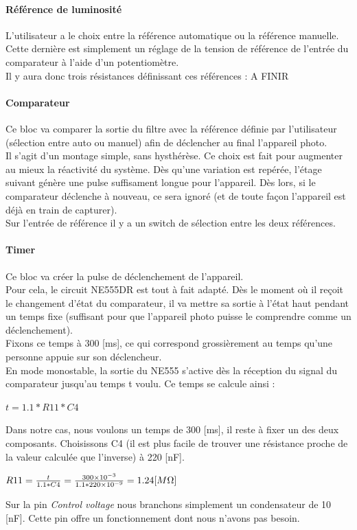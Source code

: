 \documentclass[a4paper,10pt]{article}
\begin{document}
\paragraph{Référence de luminosité}
L'utilisateur a le choix entre la référence automatique ou la référence manuelle. Cette dernière est simplement un réglage de la tension de référence de l'entrée du comparateur à l'aide d'un potentiomètre.\\
Il y aura donc trois résistances définissant ces références : A FINIR

\paragraph{Comparateur}
Ce bloc va comparer la sortie du filtre avec la référence définie par l'utilisateur (sélection entre auto ou manuel) afin de déclencher au final l'appareil photo. \\
Il s'agit d'un montage simple, sans hysthérèse. Ce choix est fait pour augmenter au mieux la réactivité du système. Dès qu'une variation est repérée, l'étage suivant génère une pulse suffisament longue pour l'appareil. Dès lors, si le comparateur déclenche à nouveau, ce sera ignoré (et de toute façon l'appareil est déjà en train de capturer). \\
Sur l'entrée de référence il y a un switch de sélection entre les deux références.

\paragraph{Timer}
Ce bloc va créer la pulse de déclenchement de l'appareil. \\
Pour cela, le circuit NE555DR est tout à fait adapté. Dès le moment où il reçoit le changement d'état du comparateur, il va mettre sa sortie à l'état haut pendant un temps fixe (suffisant pour que l'appareil photo puisse le comprendre comme un déclenchement). \\
Fixons ce temps à 300 [ms], ce qui correspond grossièrement au temps qu'une personne appuie sur son déclencheur. \\
En mode monostable, la sortie du NE555 s'active dès la réception du signal du comparateur jusqu'au temps t voulu. Ce temps se calcule ainsi :
\begin{center}
 $ t = 1.1*R11*C4 $
\end{center}
Dans notre cas, nous voulons un temps de 300 [ms], il reste à fixer un des deux composants. Choisissons C4 (il est plus facile de trouver une résistance proche de la valeur calculée que l'inverse) à 220 [nF].
\begin{center}
 $ R11 = \frac{t}{1.1*C4} = \frac{\num{300e-3}}{1.1*\num{220e-9}} = 1.24 [M\ohm] $
\end{center}
Sur la pin {\itshape Control voltage} nous branchons simplement un condensateur de 10 [nF]. Cette pin offre un fonctionnement dont nous n'avons pas besoin.
\end{document}
